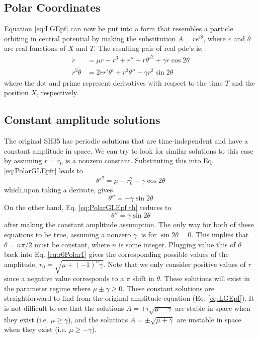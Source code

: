 \documentclass[api,pof,pre,12pt,a4paper]{revtex4-1}
\newcommand{\beqn}{\begin{equation}}
\newcommand{\eeqn}{\end{equation}}
\begin{document}
\subsection{Polar Coordinates}
Equation \ref{eq:LGEpf}  can now be put into a form that resembles a particle orbiting in central potential by making the substitution $A=r e^{i\theta}$, where $r$ and $\theta$ are real functions of $X$ and $T$.  The resulting pair of real pde's is:
\begin{subequations}
\begin{align}
\dot{r}&=\mu r - r^3 +r''-r\theta'^2+\gamma r \cos2\theta 
\label{eq:PolarGLEpfr} \\
r^2\dot{\theta}&=2 r r' \theta'+r^2\theta''-\gamma r^2 \sin 2\theta
\label{eq:PolarGLEpfth}
\end{align}
\end{subequations}
where the dot and prime represent derivatives with respect to the time $T$ and the position $X$, respectively.

\subsection{Constant amplitude solutions}
The original SH35 has periodic solutions that are time-independent and have a constant amplitude in space.  We can try to look for similar solutions to this case by assuming $r=r_0$ is a nonzero constant. Substituting this into Eq. \ref{eq:PolarGLEpfr} leads to
\beqn
\theta'^2=\mu-r_0^2+\gamma \cos2\theta
\label{eq:r0Polar1}
\eeqn
which,upon taking a derivate, gives
\beqn
\theta''=-\gamma \sin2\theta
\eeqn
On the other hand, Eq. \ref{eq:PolarGLEpf th} reduces to 
\beqn
\theta''=\gamma \sin2\theta
\eeqn
after making the constant amplitude assumption.  The only way for both of these equations to be true, assuming a nonzero $\gamma$, is for $\sin2\theta=0$. This implies that $\theta=n\pi/2$ must be constant, where $n$ is some integer.  Plugging value this of $\theta$ back into Eq. \ref{eq:r0Polar1} gives the corresponding possible values of the amplitude, $r_0=\sqrt{\mu +(-1)^n\gamma}$. Note that we only consider positive values of $r$ since a negative value corresponds to a $\pi$ shift in $\theta$. These solutions will exist in the parameter regime where $\mu\pm\gamma\ge 0$.  These constant solutions are straightforward to find from the original amplitude equation (Eq. \ref{eq:LGEpf}).  It is not difficult to see that the solutions $A=\pm i \sqrt{\mu-\gamma}$ are stable in space when they exist (i.e. $\mu \geq \gamma$), and the solutions $A=\pm \sqrt{\mu+\gamma}$ are unstable in space when they exist (i.e. $\mu \geq-\gamma$).
\end{document}
